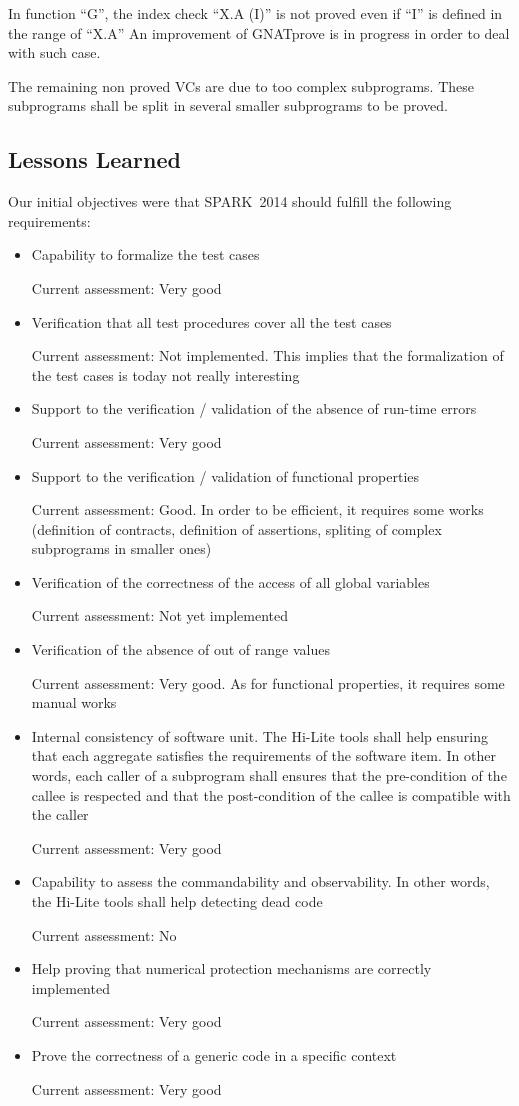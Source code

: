 \documentclass[10pt,a4paper,twocolumn]{article}
\newcommand{\hilite}{Hi-Lite\xspace}
\newcommand{\gnatprove}{GNATprove\xspace}
\newcommand{\newspark}{SPARK~2014\xspace}
\begin{document}
In function ``G'', the index check ``X.A (I)'' is not proved even if ``I'' is defined in the range of ``X.A''
An improvement of \gnatprove is in progress in order to deal with such case.

The remaining non proved VCs are due to too complex subprograms.
These subprograms shall be split in several smaller subprograms to be proved.

\subsection{Lessons Learned}

Our initial objectives were that \newspark should fulfill the following requirements:

\begin{itemize}
\item Capability to formalize the test cases

Current assessment: Very good
\item Verification that all test procedures cover all the test cases

Current assessment: Not implemented. This implies that the formalization of the test cases is today not really interesting
\item Support to the verification / validation of the absence of run-time errors

Current assessment: Very good
\item Support to the verification / validation of functional properties

Current assessment: Good. In order to be efficient, it requires some works (definition of contracts, definition of assertions, spliting of complex subprograms in smaller ones)
\item Verification of the correctness of the access of all global variables

Current assessment: Not yet implemented
\item Verification of the absence of out of range values

Current assessment: Very good. As for functional properties, it requires some manual works
\item Internal consistency of software unit. The \hilite tools shall help ensuring that each aggregate satisfies the requirements of the software item. In other words, each caller of a subprogram shall ensures that the pre-condition of the callee is respected and that the post-condition of the callee is compatible with the caller

Current assessment: Very good
\item Capability to assess the commandability and observability. In other words, the \hilite tools shall help detecting dead code

Current assessment: No
\item Help proving that numerical protection mechanisms are correctly implemented

Current assessment: Very good
\item Prove the correctness of a generic code in a specific context

Current assessment: Very good
\end{itemize}
\end{document}
